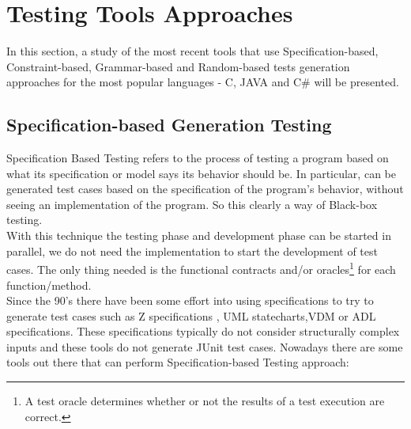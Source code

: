 \section{Testing Tools Approaches}\label{testingapproaches}
In this section, a study of the most recent tools that use Specification-based, Constraint-based, Grammar-based and Random-based tests generation
approaches for the most popular languages - C, JAVA and C\# will be presented.

\subsection{Specification-based Generation Testing}
Specification Based Testing refers to the process of testing a program based on what its specification or model says its behavior should be.
In particular, can be generated test cases based on the specification of the program's behavior, without seeing an implementation of the program. So this clearly a
way of Black-box testing.\\
With this technique the testing phase and development phase can be started in parallel, we do not need the implementation
to start the development of test cases. The only thing needed is the functional contracts and/or oracles\footnote{A test oracle determines whether or not the results of a test execution are correct\cite{Peters95generatinga}.} for each function/method.\\
Since the 90's there have been some effort into using specifications to try to generate test cases such as Z specifications
\cite{Horcher95improvingsoftware,Stocks:1996:FST:239916.239918}, UML statecharts\cite{Offutt:1999:GTU:1767297.1767341},VDM\cite{Aichernig99automatedblack-box}
or ADL specifications\cite{Sankar94specifyingand}.
These specifications typically do not consider structurally complex inputs and these tools do not generate JUnit test cases.
Nowadays there are some tools out there that can perform Specification-based Testing approach:


